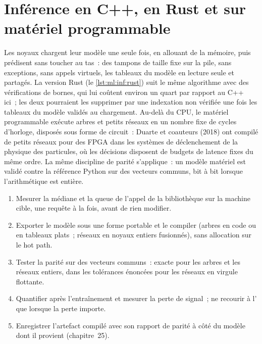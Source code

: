 \section{Inférence en C++, en Rust et sur matériel programmable}

Les noyaux chargent leur modèle une seule fois, en allouant de la mémoire, puis prédisent sans toucher au tas~: des tampons de taille fixe sur la pile, sans
exceptions, sans appels virtuels, les tableaux du modèle en lecture seule et partagés. La version Rust (le \cref{lst:ml:inf:rust}) suit le même
algorithme avec des vérifications de bornes, qui lui coûtent environ un quart par rapport au C++ ici~; les deux pourraient les supprimer par une indexation non vérifiée
une fois les tableaux du modèle validés au chargement. Au-delà du CPU, le matériel programmable exécute arbres et petits réseaux en
un nombre fixe de cycles d'horloge, disposés sous forme de circuit~: Duarte et coauteurs (2018) ont compilé de petits réseaux pour des FPGA dans les
systèmes de déclenchement de la physique des particules, où les décisions disposent de budgets de latence fixes du même ordre. La même discipline de
parité s'applique~: un modèle matériel est validé contre la référence Python sur des vecteurs communs, bit à bit lorsque l'arithmétique est
entière.

\begin{method}\label{met:ml:inf:method}
\begin{enumerate}
\item Mesurer la médiane et la queue de l'appel de la bibliothèque sur la machine cible, une requête à la fois, avant de rien modifier.
\item Exporter le modèle sous une forme portable et le compiler (arbres en code ou en tableaux plats~; réseaux en noyaux entiers fusionnés),
sans allocation sur le hot path.
\item Tester la parité sur des vecteurs communs~: exacte pour les arbres et les réseaux entiers, dans les tolérances énoncées pour les
réseaux en virgule flottante.
\item Quantifier après l'entraînement et mesurer la perte de signal~; ne recourir à l' que lorsque la perte importe.
\item Enregistrer l'artefact compilé avec son rapport de parité à côté du modèle dont il provient (chapitre~25).
\end{enumerate}
\end{method}

